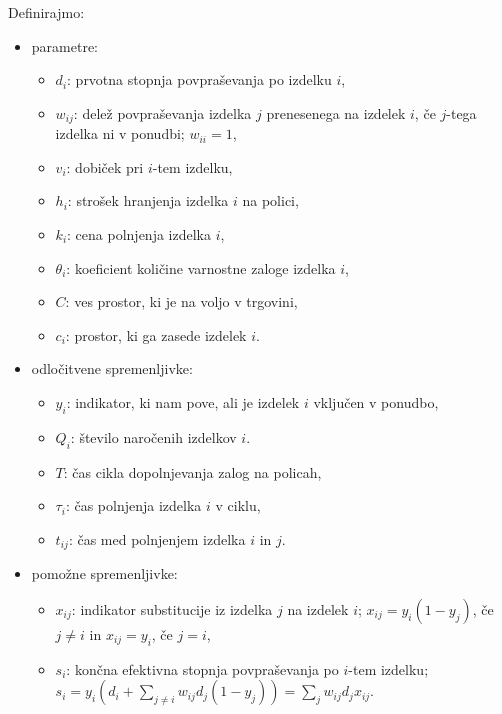 \documentclass[a4paper]{article}
\begin{document}
\vspace{3 mm}
Definirajmo:
\begin{itemize}
\item parametre:
\begin{itemize}
\item $ d_i $: prvotna stopnja povpraševanja po izdelku $i$,
\item $ w_{ij}$: delež povpraševanja izdelka $j$ prenesenega na izdelek $i$, če $j$-tega izdelka ni v ponudbi; $w_{ii} = 1$,
\item $ v_i $: dobiček pri $i$-tem izdelku,
\item $ h_i $: strošek hranjenja izdelka $i$ na polici,
\item $ k_i $: cena polnjenja izdelka $i$, 
\item $ \theta_i $: koeficient količine varnostne zaloge izdelka $i$,
\item $ C $: ves prostor, ki je na voljo v trgovini,
\item $ c_i $: prostor, ki ga zasede izdelek $i$.
\end{itemize}

\item odločitvene spremenljivke:
\begin{itemize}
\item $ y_i $: indikator, ki nam pove, ali je izdelek $i$ vključen v ponudbo,
\item $ Q_i $: število naročenih izdelkov $i$.
\item $ T $: čas cikla dopolnjevanja zalog na policah,
\item $ \tau_i $: čas polnjenja izdelka $i$ v ciklu,
\item $ t_{ij}$: čas med polnjenjem izdelka $i$ in $j$.
\end{itemize}

\item pomožne spremenljivke:
\begin{itemize}
\item $ x_{ij} $: indikator substitucije iz izdelka $j$ na izdelek $i$; $x_{ij} = y_i (1-y_j)$, če $j \ne i$ in $x_{ij} = y_i$, če  $j = i$,
\item $ s_i $: končna efektivna stopnja povpraševanja po $i$-tem izdelku; $s_i = y_i (d_i + \sum_{j \ne i} w_{ij} d_j (1-y_j)) = \sum_j  w_{ij} d_j x_{ij}.$
\end{itemize} 
\end{itemize}
\end{document}
